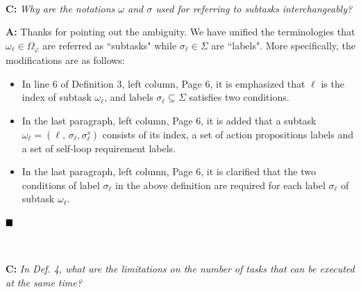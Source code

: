 \documentclass[10pt]{article}
\begin{document}
\hspace*{\fill} \


\textbf{C:}
\emph{Why are the notations $\omega$ and $\sigma$ used for referring to
	subtasks interchangeably?}

\textbf{A:} Thanks for pointing out the ambiguity.
We have unified the terminologies that $\omega_\ell\in \Omega_\varphi$ are referred
as ``subtasks" while $\sigma_\ell\in \Sigma$ are ``labels".
More specifically, the modifications are as follows:
\begin{itemize}
\item In line 6 of Definition 3, left column, Page 6, it is emphasized that $\ell$ is the index of subtask {$\omega_\ell$}, and {labels} $\sigma_\ell\subseteq\Sigma$ satisfies two conditions.

\item In the last paragraph, left column, Page 6, it is added that
  a {subtask $\omega_\ell=(\ell,\,\sigma_\ell,\sigma^s_\ell)$} consists of
  its index, a set of action propositions labels and
  a set of self-loop requirement labels.

\item In the last paragraph, left column, Page 6, it is clarified that the two conditions of label $\sigma_\ell$ in the above definition are required for
  each label $\sigma_\ell$ of subtask $\omega_\ell$.
\end{itemize}

$\hfill\blacksquare$




\hspace*{\fill} \


\textbf{C:}
\emph{In Def. 4,  what are the limitations on the number of tasks that can
	be executed at the same time?
}
\end{document}
